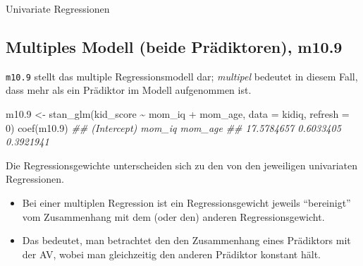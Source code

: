 \documentclass[
  a4paper,
  DIV=11]{scrreprt}
\newenvironment{Shaded}{\begin{snugshade}}{\end{snugshade}}
\newcommand{\AttributeTok}[1]{\textcolor[rgb]{0.40,0.45,0.13}{#1}}
\newcommand{\DecValTok}[1]{\textcolor[rgb]{0.68,0.00,0.00}{#1}}
\newcommand{\DocumentationTok}[1]{\textcolor[rgb]{0.37,0.37,0.37}{\textit{#1}}}
\newcommand{\FloatTok}[1]{\textcolor[rgb]{0.68,0.00,0.00}{#1}}
\newcommand{\FunctionTok}[1]{\textcolor[rgb]{0.28,0.35,0.67}{#1}}
\newcommand{\NormalTok}[1]{\textcolor[rgb]{0.00,0.23,0.31}{#1}}
\newcommand{\OtherTok}[1]{\textcolor[rgb]{0.00,0.23,0.31}{#1}}
\newcommand{\SpecialCharTok}[1]{\textcolor[rgb]{0.37,0.37,0.37}{#1}}
\providecommand{\tightlist}{%
  \setlength{\itemsep}{0pt}\setlength{\parskip}{0pt}}\usepackage{longtable,booktabs,array}
\theoremstyle{definition}
\theoremstyle{remark}
\begin{document}
Univariate Regressionen

\hypertarget{multiples-modell-beide-pruxe4diktoren-m10.9}{%
\subsection{Multiples Modell (beide Prädiktoren),
m10.9}\label{multiples-modell-beide-pruxe4diktoren-m10.9}}

\texttt{m10.9} stellt das multiple Regressionsmodell dar;
\emph{multipel} bedeutet in diesem Fall, dass mehr als ein Prädiktor im
Modell aufgenommen ist.

\begin{Shaded}
\begin{Highlighting}[]
\NormalTok{m10}\FloatTok{.9} \OtherTok{\textless{}{-}} \FunctionTok{stan\_glm}\NormalTok{(kid\_score }\SpecialCharTok{\textasciitilde{}}\NormalTok{ mom\_iq }\SpecialCharTok{+}\NormalTok{ mom\_age, }
                  \AttributeTok{data =}\NormalTok{ kidiq, }
                  \AttributeTok{refresh =} \DecValTok{0}\NormalTok{)}
\FunctionTok{coef}\NormalTok{(m10}\FloatTok{.9}\NormalTok{)}
\DocumentationTok{\#\# (Intercept)      mom\_iq     mom\_age }
\DocumentationTok{\#\#  17.5784657   0.6033405   0.3921941}
\end{Highlighting}
\end{Shaded}

\begin{tcolorbox}[enhanced jigsaw, leftrule=.75mm, left=2mm, bottomrule=.15mm, opacityback=0, coltitle=black, colbacktitle=quarto-callout-important-color!10!white, opacitybacktitle=0.6, rightrule=.15mm, toptitle=1mm, colback=white, colframe=quarto-callout-important-color-frame, arc=.35mm, toprule=.15mm, breakable, titlerule=0mm, bottomtitle=1mm, title=\textcolor{quarto-callout-important-color}{\faExclamation}\hspace{0.5em}{Wichtig}]
Die Regressionsgewichte unterscheiden sich zu den von den jeweiligen
univariaten Regressionen.
\end{tcolorbox}

\begin{itemize}
\tightlist
\item
  Bei einer multiplen Regression ist ein Regressionsgewicht jeweils
  ``bereinigt'' vom Zusammenhang mit dem (oder den) anderen
  Regressionsgewicht.
\item
  Das bedeutet, man betrachtet den den Zusammenhang eines Prädiktors mit
  der AV, wobei man gleichzeitig den anderen Prädiktor konstant hält.
\end{itemize}
\end{document}
